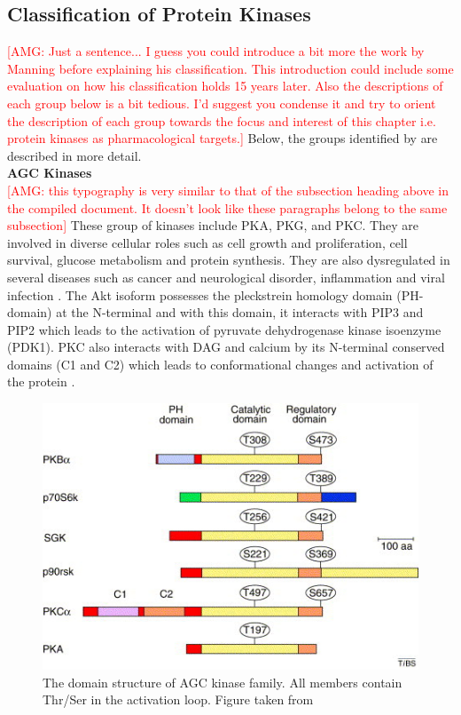 \documentclass[a4paper, 11pt]{article}
\newcommand{\redcomment}[1]{\textcolor{red}{[#1]}} %
\begin{document}
\subsection*{Classification of Protein Kinases}
\redcomment{AMG: Just a sentence... I guess you could introduce a bit more the work by Manning before explaining his classification. This introduction could include some evaluation on how his classification holds 15 years later. Also the descriptions of each group below is a bit tedious. I'd suggest you condense it and try to orient the description of each group towards the focus and interest of this chapter i.e. protein kinases as pharmacological targets.}
Below, the groups identified by \cite{manning2002protein} are described in more detail. \\

\textbf{AGC Kinases}\\ 
\redcomment{AMG: this typography is very similar to that of the subsection heading above in the compiled document. It doesn't look like these paragraphs belong to the same subsection}
These group of kinases include PKA, PKG, and PKC. They are involved in diverse cellular roles such as cell growth and proliferation, cell survival, glucose metabolism and protein synthesis. They are also dysregulated in several diseases such as cancer and neurological disorder, inflammation and viral infection \cite {rakshambikai2015typical}. The Akt isoform possesses the pleckstrein homology domain (PH-domain) at the N-terminal and with this domain, it interacts with PIP3 and PIP2  which leads to the activation of pyruvate dehydrogenase kinase isoenzyme (PDK1). PKC also interacts with DAG and calcium by its N-terminal conserved domains (C1 and C2) which leads to conformational changes and activation of the protein \cite{duong2013human}.\\
\begin{figure}[H]
	\includegraphics[width=.8\linewidth]{figures/agc_kinase.jpg}
	\centering
	\caption{The domain structure of AGC kinase family. All members contain Thr/Ser in the activation loop. Figure taken from \cite{brazil2001ten} }
	\label{agc_kinase}
\end{figure}
\end{document}
